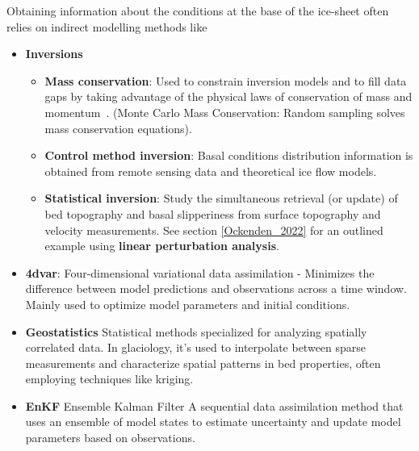 Obtaining information about the conditions at the base of the ice-sheet often relies on indirect modelling methods like
\begin{itemize}

    \item\textbf{Inversions}
        \begin{itemize}
            \item\textbf{Mass conservation}: Used to constrain inversion models and to fill data gaps by taking advantage of the physical laws of conservation of mass and momentum~\cite{Morlighem_2017, Morlighem_2020}. (Monte Carlo Mass Conservation: Random sampling solves mass conservation equations\cite{Brinkerhoff_2016}).
            \item\textbf{Control method inversion}: Basal conditions distribution information is obtained from remote sensing data and theoretical ice flow models\cite{deRydt_2013}.
            \item\textbf{Statistical inversion}: Study the simultaneous retrieval (or update) of bed topography and basal slipperiness from surface topography and velocity measurements\cite{deRydt_2013}. See section \ref{Ockenden_2022} for an outlined example using \textbf{linear perturbation analysis}.
        \end{itemize}

    \item\textbf{4dvar}: Four-dimensional variational data assimilation - Minimizes the difference between model predictions and observations across a time window. Mainly used to optimize model parameters and initial conditions\cite{Morlighem_Goldberg_2024}.

    \item\textbf{Geostatistics} Statistical methods specialized for analyzing spatially correlated data. In glaciology, it's used to interpolate between sparse measurements and characterize spatial patterns in bed properties, often employing techniques like kriging\cite{Mackie_2020}.

    \item\textbf{EnKF} Ensemble Kalman Filter A sequential data assimilation method that uses an ensemble of model states to estimate uncertainty and update model parameters based on observations\cite{Morlighem_Goldberg_2024}.
    
\end{itemize} 


